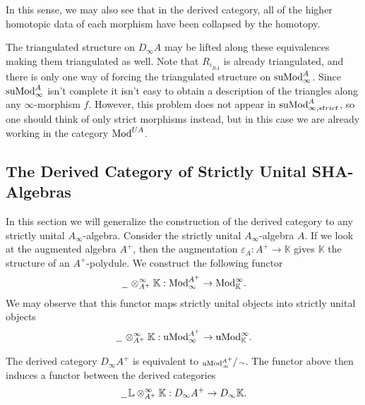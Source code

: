 \documentclass[../thesis.tex]{subfiles}
\begin{document}
            In this sense, we may also see that in the derived category, all of the higher homotopic data of each morphism have been collapsed by the homotopy.

            The triangulated structure on $D_\infty A$ may be lifted along these equivalences making them triangulated as well. Note that $R_{\iota_{B\overline{A}}}$ is already triangulated, and there is only one way of forcing the triangulated structure on $\tt{suMod}_\infty^A$. Since $\tt{suMod}_{\infty}^A$ isn't complete it isn't easy to obtain a description of the triangles along any $\infty$-morphism $f$. However, this problem does not appear in $\tt{suMod}_{\infty, strict}^A$, so one should think of only strict morphisms instead, but in this case we are already working in the category $\tt{Mod}^{UA}$. 

        \subsection{The Derived Category of Strictly Unital SHA-Algebras}

            In this section we will generalize the construction of the derived category to any strictly unital $A_\infty$-algebra. Consider the strictly unital $A_\infty$-algebra $A$. If we look at the augmented algebra $A^+$, then the augmentation $\varepsilon_A : A^+ \rightarrow \mathbb{K}$ gives $\mathbb{K}$ the structure of an $A^+$-polydule. We construct the following functor
            \begin{align*}
                \argument\otimes_{A^+}^\infty\mathbb{K} : \tt{Mod}_\infty^{A^+} \rightarrow \tt{Mod}_\mathbb{K}^\infty\tt{.}
            \end{align*}
            We may observe that this functor maps strictly unital objects into strictly unital objects
            \begin{align*}
                \argument\otimes_{A^+}^\infty\mathbb{K} : \tt{uMod}_\infty^{A^+} \rightarrow \tt{uMod}_\mathbb{K}^\infty\tt{.}
            \end{align*}

            The derived category $D_\infty A^+$ is equivalent to $\sfrac{\tt{uMod}_\infty^{A^+}}{\sim}$. The functor above then induces a functor between the derived categories
            \begin{align*}
                \argument\mathbb{L}\otimes_{A^+}^\infty\mathbb{K} : D_\infty A^+ \rightarrow D_\infty \mathbb{K}\tt{.}
            \end{align*}
\end{document}
